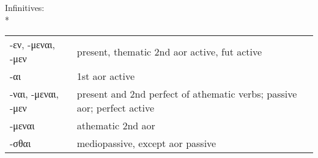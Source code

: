 \begin{small}

\pagebreak


Infinitives:\\*
%
\begin{tabular}{lp{3in}}
-εν, -μεναι, -μεν   &  present, thematic 2nd aor active, fut active \\
-αι\footnotemark    &  1st aor active \\
-ναι, -μεναι, -μεν  & present and 2nd perfect of athematic verbs; passive aor; perfect active \\
-μεναι              &  athematic 2nd aor \\
-σθαι               &  mediopassive, except aor passive \\
\end{tabular}


\end{small}
